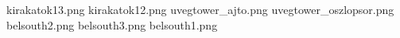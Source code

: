 kirakatok13.png
kirakatok12.png
uvegtower_ajto.png
uvegtower_oszlopsor.png
belsouth2.png
belsouth3.png
belsouth1.png
